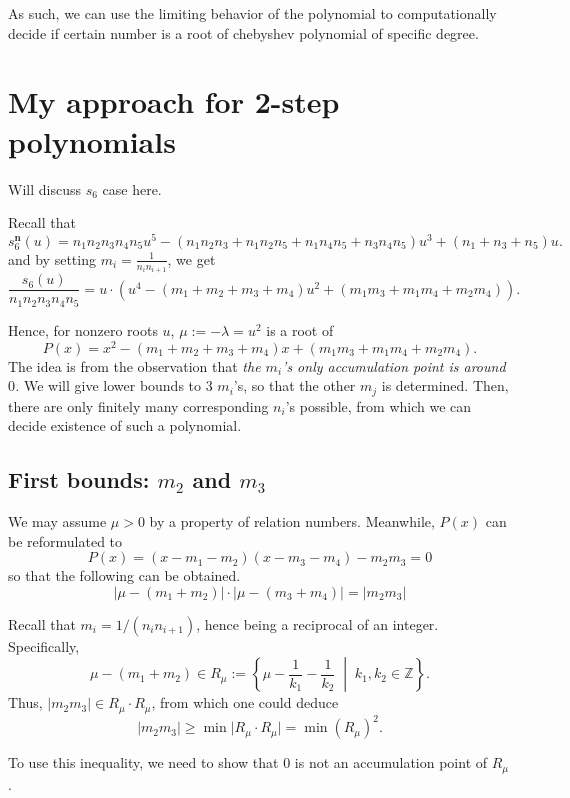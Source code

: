 \documentclass{article}
\theoremstyle{definition}
\theoremstyle{plain}
\theoremstyle{remark}
\numberwithin{equation}{section}
\newcommand{\integer}{\mathbb{Z}}
\begin{document}
As such, we can use the limiting behavior of the polynomial to computationally decide
if certain number is a root of chebyshev polynomial of specific degree.

\newpage

\section{My approach for 2-step polynomials}

Will discuss $s_6$ case here.

Recall that
\[
  s^\mathbf{n}_6(u) = n_1 n_2 n_3 n_4 n_5 u^5
  - (n_1 n_2 n_3 + n_1 n_2 n_5 + n_1 n_4 n_5 + n_3 n_4 n_5) u^3
  + (n_1 + n_3 + n_5) u.
\]
and by setting $m_i = \frac{1}{n_i n_{i+1}}$, we get
\[
  \frac{s_6(u)}{n_1 n_2 n_3 n_4 n_5} = u \cdot (u^4 - (m_1 + m_2 + m_3 + m_4) u^2 + (m_1 m_3 + m_1 m_4 + m_2 m_4)).
\]

Hence, for nonzero roots $u$, $\mu := -\lambda = u^2$ is a root of
\[
  P(x) = x^2 - (m_1 + m_2 + m_3 + m_4) x + (m_1 m_3 + m_1 m_4 + m_2 m_4).
\]
The idea is from the observation that \textit{the $m_i$'s only accumulation point is around $0$.}
We will give lower bounds to 3 $m_i$'s, so that the other $m_j$ is determined.
Then, there are only finitely many corresponding $n_i$'s possible,
from which we can decide existence of such a polynomial.

\subsection{First bounds: $m_2$ and $m_3$}

We may assume $\mu > 0$ by a property of relation numbers.
Meanwhile, $P(x)$ can be reformulated to
\[
  P(x) = (x - m_1 - m_2) (x - m_3 - m_4) - m_2 m_3 = 0
\]
so that the following can be obtained.
\[
  \lvert \mu - (m_1 + m_2) \rvert \cdot \lvert \mu - (m_3 + m_4) \rvert = \lvert m_2 m_3 \rvert
\]

Recall that $m_i = 1 / (n_i n_{i+1})$, hence being a reciprocal of an integer.
Specifically,
\[
  \mu - (m_1 + m_2) \in
  R_\mu := \left\{ \mu - \frac{1}{k_1} - \frac{1}{k_2} \; \middle\vert \; k_1, k_2 \in \integer \right\}.
\]
Thus, $\lvert m_2 m_3 \rvert \in R_\mu \cdot R_\mu$,
from which one could deduce
\[ \lvert m_2 m_3 \rvert \geq \min \lvert R_\mu \cdot R_\mu \rvert = \min(R_\mu)^2. \]

To use this inequality, we need to show that $0$ is not an accumulation point of $R_\mu$.
\end{document}

